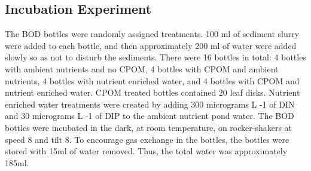 \subsection{Incubation Experiment}

The BOD bottles were randomly assigned treatments. 100 ml of sediment slurry were added to each bottle, and then approximately 200 ml of water were added slowly so as not to disturb the sediments. There were 16 bottles in total: 4 bottles with ambient nutrients and no CPOM, 4 bottles with CPOM and ambient nutrients, 4 bottles with nutrient enriched water, and 4 bottles with CPOM and nutrient enriched water. CPOM treated bottles contained 20 leaf disks. Nutrient enriched water treatments were created by adding 300 micrograms L -1 of DIN and 30 micrograms L -1 of DIP to the ambient nutrient pond water. The BOD bottles were incubated in the dark, at room temperature, on rocker-shakers at speed 8 and tilt 8. To encourage gas exchange in the bottles, the bottles were stored with 15ml of water removed. Thus, the total water was approximately 185ml. 